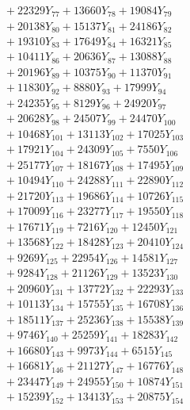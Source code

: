 \documentclass[a4paper,10pt]{article}
\begin{document}
{\begin{align}
&\;  + 22329 Y_{77} + 13660 Y_{78} + 19084 Y_{79} \\[0.3ex]
&\;  + 20138 Y_{80} + 15137 Y_{81} + 24186 Y_{82} \\[0.3ex]
&\;  + 19310 Y_{83} + 17649 Y_{84} + 16321 Y_{85} \\[0.3ex]
&\;  + 10411 Y_{86} + 20636 Y_{87} + 13088 Y_{88} \\[0.5ex]\allowbreak
&\;  + 20196 Y_{89} + 10375 Y_{90} + 11370 Y_{91} \\[0.3ex]
&\;  + 11830 Y_{92} + 8880 Y_{93} + 17999 Y_{94} \\[0.3ex]
&\;  + 24235 Y_{95} + 8129 Y_{96} + 24920 Y_{97} \\[0.3ex]
&\;  + 20628 Y_{98} + 24507 Y_{99} + 24470 Y_{100} \\[0.3ex]
&\;  + 10468 Y_{101} + 13113 Y_{102} + 17025 Y_{103} \\[0.3ex]
&\;  + 17921 Y_{104} + 24309 Y_{105} + 7550 Y_{106} \\[0.3ex]
&\;  + 25177 Y_{107} + 18167 Y_{108} + 17495 Y_{109} \\[0.3ex]
&\;  + 10494 Y_{110} + 24288 Y_{111} + 22890 Y_{112} \\[0.3ex]
&\;  + 21720 Y_{113} + 19686 Y_{114} + 10726 Y_{115} \\[0.3ex]
&\;  + 17009 Y_{116} + 23277 Y_{117} + 19550 Y_{118} \\[0.5ex]\allowbreak
&\;  + 17671 Y_{119} + 7216 Y_{120} + 12450 Y_{121} \\[0.3ex]
&\;  + 13568 Y_{122} + 18428 Y_{123} + 20410 Y_{124} \\[0.3ex]
&\;  + 9269 Y_{125} + 22954 Y_{126} + 14581 Y_{127} \\[0.3ex]
&\;  + 9284 Y_{128} + 21126 Y_{129} + 13523 Y_{130} \\[0.3ex]
&\;  + 20960 Y_{131} + 13772 Y_{132} + 22293 Y_{133} \\[0.3ex]
&\;  + 10113 Y_{134} + 15755 Y_{135} + 16708 Y_{136} \\[0.3ex]
&\;  + 18511 Y_{137} + 25236 Y_{138} + 15538 Y_{139} \\[0.3ex]
&\;  + 9746 Y_{140} + 25259 Y_{141} + 18283 Y_{142} \\[0.3ex]
&\;  + 16680 Y_{143} + 9973 Y_{144} + 6515 Y_{145} \\[0.3ex]
&\;  + 16681 Y_{146} + 21127 Y_{147} + 16776 Y_{148} \\[0.5ex]\allowbreak
&\;  + 23447 Y_{149} + 24955 Y_{150} + 10874 Y_{151} \\[0.3ex]
&\;  + 15239 Y_{152} + 13413 Y_{153} + 20875 Y_{154} \\[0.3ex]

\end{align}}
\end{document}
